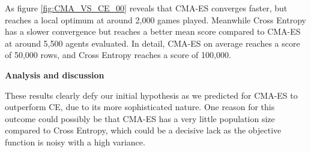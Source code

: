 As figure \ref{fig:CMA_VS_CE_00} reveals that CMA-ES converges faster,
but reaches a local optimum at around 2,000 games played. Meanwhile Cross Entropy has a 
slower convergence but reaches a better mean score compared to CMA-ES at around 5,500
agents evaluated. In detail, CMA-ES on average reaches a score of 50,000 rows, and
Cross Entropy reaches a score of 100,000.\\


\textbf{Analysis and discussion}

These results clearly defy our initial hypothesis as we predicted
for CMA-ES to outperform CE, due to its more sophisticated nature. 
One reason for this outcome could possibly be that
CMA-ES has a very little population size compared to Cross Entropy,
which could be a decisive lack as the objective function is noisy with 
a high variance.\\

